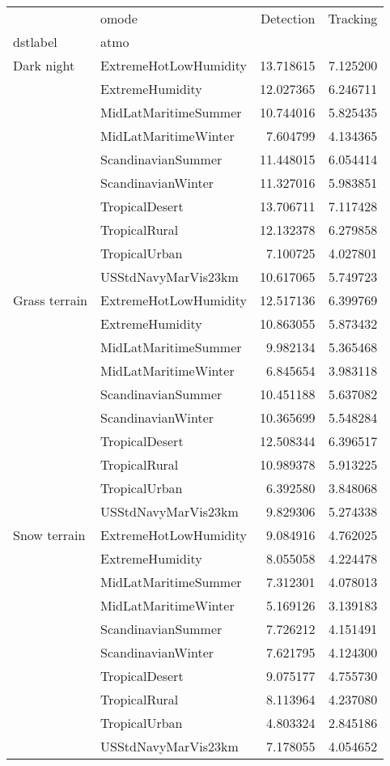 \begin{tabular}{llrr}
\toprule
             & omode &  Detection &  Tracking \\
dstlabel & atmo &            &           \\
\midrule
Dark night & ExtremeHotLowHumidity &  13.718615 &  7.125200 \\
             & ExtremeHumidity &  12.027365 &  6.246711 \\
             & MidLatMaritimeSummer &  10.744016 &  5.825435 \\
             & MidLatMaritimeWinter &   7.604799 &  4.134365 \\
             & ScandinavianSummer &  11.448015 &  6.054414 \\
             & ScandinavianWinter &  11.327016 &  5.983851 \\
             & TropicalDesert &  13.706711 &  7.117428 \\
             & TropicalRural &  12.132378 &  6.279858 \\
             & TropicalUrban &   7.100725 &  4.027801 \\
             & USStdNavyMarVis23km &  10.617065 &  5.749723 \\
Grass terrain & ExtremeHotLowHumidity &  12.517136 &  6.399769 \\
             & ExtremeHumidity &  10.863055 &  5.873432 \\
             & MidLatMaritimeSummer &   9.982134 &  5.365468 \\
             & MidLatMaritimeWinter &   6.845654 &  3.983118 \\
             & ScandinavianSummer &  10.451188 &  5.637082 \\
             & ScandinavianWinter &  10.365699 &  5.548284 \\
             & TropicalDesert &  12.508344 &  6.396517 \\
             & TropicalRural &  10.989378 &  5.913225 \\
             & TropicalUrban &   6.392580 &  3.848068 \\
             & USStdNavyMarVis23km &   9.829306 &  5.274338 \\
Snow terrain & ExtremeHotLowHumidity &   9.084916 &  4.762025 \\
             & ExtremeHumidity &   8.055058 &  4.224478 \\
             & MidLatMaritimeSummer &   7.312301 &  4.078013 \\
             & MidLatMaritimeWinter &   5.169126 &  3.139183 \\
             & ScandinavianSummer &   7.726212 &  4.151491 \\
             & ScandinavianWinter &   7.621795 &  4.124300 \\
             & TropicalDesert &   9.075177 &  4.755730 \\
             & TropicalRural &   8.113964 &  4.237080 \\
             & TropicalUrban &   4.803324 &  2.845186 \\
             & USStdNavyMarVis23km &   7.178055 &  4.054652 \\
\bottomrule
\end{tabular}


